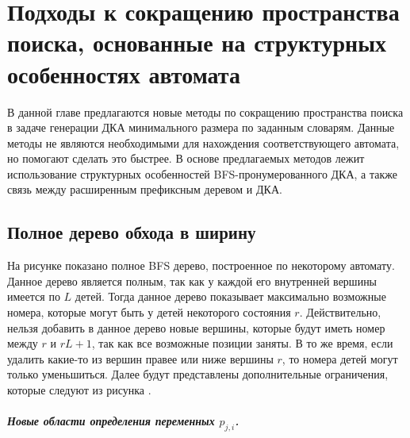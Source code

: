 
\chapter{Подходы к сокращению пространства поиска, основанные на структурных особенностях автомата} 
\label{sec:pruning}

В данной главе предлагаются новые методы по сокращению пространства поиска в задаче генерации ДКА минимального размера по заданным словарям. 
Данные методы не являются необходимыми для нахождения соответствующего автомата, но помогают сделать это быстрее.
В основе предлагаемых методов лежит использование структурных особенностей BFS-пронумерованного ДКА, а также связь между расширенным префиксным деревом и ДКА.

\section{Полное дерево обхода в ширину}
\label{sec:pruning:bfs-tree}


На рисунке  показано полное BFS дерево, построенное по некоторому автомату.
Данное дерево является полным, так как у каждой его внутренней вершины имеется по $L$ детей.
Тогда данное дерево показывает максимально возможные номера, которые могут быть у детей некоторого состояния $r$.
Действительно, нельзя добавить в данное дерево новые вершины, которые будут иметь номер между $r$ и $rL + 1$, так как все возможные позиции заняты.
В то же время, если удалить какие-то из вершин правее или ниже вершины $r$, то номера детей могут только уменьшиться.
Далее будут представлены дополнительные ограничения, которые следуют из рисунка .

\paragraph{Новые области определения переменных $p_{j,i}$.}

